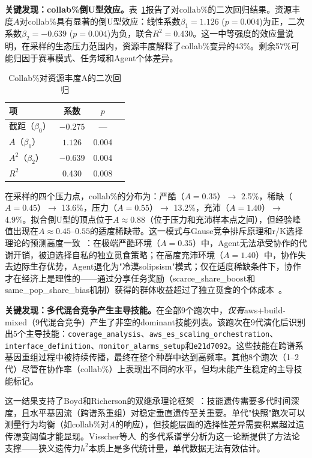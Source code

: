 \documentclass[conference]{IEEEtran}
\begin{document}
\textbf{关键发现：collab\%倒U型效应。}表~\ref{tab:regression}报告了对collab\%的二次回归结果。资源丰度$A$对collab\%具有显著的倒U型效应：线性系数$\beta_1=1.126$ ($p=0.004$)为正，二次系数$\beta_2=-0.639$ ($p=0.004$)为负，联合$R^2=0.430$。这一中等强度的效应量说明，在采样的生态压力范围内，资源丰度解释了collab\%变异的43\%。剩余57\%可能归因于赛事模式、任务域和Agent个体差异。

\begin{table}[t]
\centering
\caption{Collab\%对资源丰度A的二次回归}
\label{tab:regression}
\begin{tabular}{lccc}
\toprule
项 & 系数 & $p$ & \\
\midrule
截距（$\beta_0$） & $-0.275$ & --- & \\
$A$（$\beta_1$） & $1.126$ & 0.004 & \\
$A^2$（$\beta_2$） & $-0.639$ & 0.004 & \\
\midrule
$R^2$ & 0.430 & 0.008 & \\
\bottomrule
\end{tabular}
\end{table}

在采样的四个压力点，collab\%的分布为：严酷（$A=0.35$）$\to$ 2.5\%，稀缺（$A=0.45$）$\to$ 13.6\%，压力（$A=0.55$）$\to$ 13.2\%，充沛（$A=1.40$）$\to$ 4.9\%。拟合倒U型的顶点位于$A\approx0.88$（位于压力和充沛样本点之间），但经验峰值出现在$A\approx0.45\text{--}0.55$的适度稀缺带。这一模式与Gause竞争排斥原理和r/K选择理论的预测高度一致~\cite{gause1934struggle}：在极端严酷环境（$A=0.35$）中，Agent无法承受协作的代谢开销，被迫选择自私的独立觅食策略；在高度充沛环境（$A=1.40$）中，协作失去边际生存优势，Agent退化为"冷漠solipsism"模式；仅在适度稀缺条件下，协作才在经济上是理性的——通过分享任务奖励（scarce\_share\_boost和same\_pop\_share\_bias机制）获得的群体收益超过了独立觅食的个体成本~\cite{nowak2006five}。

\textbf{关键发现：多代混合竞争产生主导技能。}在全部9个跑次中，\emph{仅有}aws+build-mixed（9代混合竞争）产生了非空的dominant技能列表。该跑次在9代演化后识别出5个主导技能：{\texttt{coverage\_analysis}}、{\texttt{aws\_es\_scaling\_orchestration}}、{\texttt{interface\_definition}}、{\texttt{monitor\_alarms\_setup}}和{\texttt{e21d7092}}。这些技能在跨谱系基因重组过程中被持续传播，最终在整个种群中达到高频率。其他8个跑次（1--2代）尽管在协作率（collab\%）上表现出不同的水平，但均未能产生稳定的主导技能标记。

这一结果支持了Boyd和Richerson的双继承理论框架~\cite{boyd1985culture}：技能遗传需要多代时间深度，且水平基因流（跨谱系重组）对稳定垂直遗传至关重要。单代"快照"跑次可以测量行为均衡（如collab\%对$A$的响应），但技能层面的选择性差异需要积累超过遗传漂变阈值才能显现。Visscher等人~\cite{visscher2008heritability}的多代系谱学分析为这一论断提供了方法论支撑——狭义遗传力$h^2$本质上是多代统计量，单代数据无法有效估计。
\end{document}
